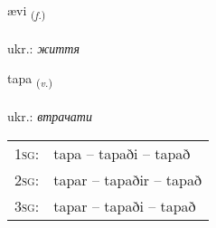 \documentclass[frontgrid, backgrid]{flacards}\usepackage[]{graphicx}\usepackage[]{xcolor}
\begin{document}
\renewcommand{\flhead}{\vskip5pt \fboxsep=0pt {\small\bfseries\footnotesize Nafnorð | іменник}}
\renewcommand{\fcfoot}{\vskip5pt \fboxsep=0pt \hspace{2pt}{\small\bfseries\footnotesize 2K}}

\renewcommand{\blhead}{\vskip5pt {\small\bfseries\footnotesize Nafnorð | іменник }}
\renewcommand{\bcfoot}{\vskip5pt \hspace{2pt}{\small\bfseries\footnotesize 2K}}


{ævi \small{\textsubscript{(\textit{f.})}} \\[1ex] %
\textphonetic{[aiːvɪ]} \\
ukr.: \emph{життя} \\  [2ex]
\renewcommand*{\arraystretch}{0.8}
}

\renewcommand{\flhead}{\vskip5pt \fboxsep=0pt {\small\bfseries\footnotesize Sagnorð | дієслово}}
\renewcommand{\fcfoot}{\vskip5pt \fboxsep=0pt \hspace{2pt}{\small\bfseries\footnotesize 2K}}

\renewcommand{\blhead}{\vskip5pt {\small\bfseries\footnotesize Sagnorð | дієслово }}
\renewcommand{\bcfoot}{\vskip5pt \hspace{2pt}{\small\bfseries\footnotesize 2K}}


{tapa \small{\textsubscript{(\textit{v.})}} \\[1ex] %
\textphonetic{[tʰaːpa]} \\
ukr.: \emph{втрачати} \\  [2ex]
\renewcommand*{\arraystretch}{0.8}
\begin{tabular}{p{1cm}l}
\textsc{1sg}: & tapa -- tapaði -- tapað \\ 
\textsc{2sg}: & tapar -- tapaðir -- tapað \\ 
\textsc{3sg}: & tapar -- tapaði -- tapað \\ 
\end{tabular}
}
\end{document}

